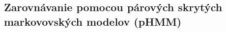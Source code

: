 






\subsection{Zarovnávanie pomocou párových skrytých markovovských modelov (pHMM)}
\label{subsec:hmm-alignment}

